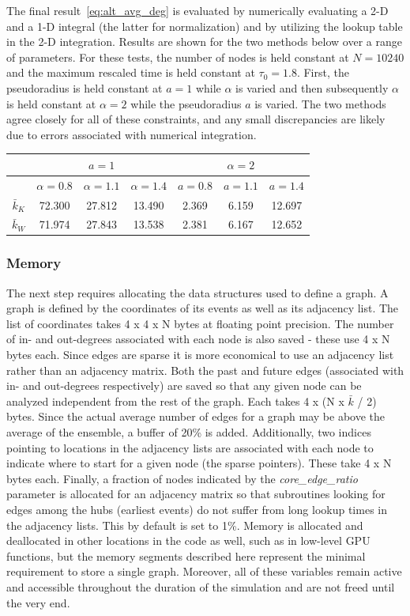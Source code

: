 \documentclass[preprint,notitlepage,amsmath,amssymb,floatfix]{revtex4-1}
\begin{document}
\noindent The final result~\eqref{eq:alt_avg_deg} is evaluated by numerically evaluating a 2-D and a 1-D integral (the latter for normalization) and by utilizing the lookup table in the 2-D integration.
Results are shown for the two methods below over a range of parameters.
For these tests, the number of nodes is held constant at $N = 10240$ and the maximum rescaled time is held constant at $\tau_0 = 1.8$.
First, the pseudoradius is held constant at $a = 1$ while $\alpha$ is varied and then subsequently $\alpha$ is held constant at $\alpha = 2$ while the pseudoradius $a$ is varied.
The two methods agree closely for all of these constraints, and any small discrepancies are likely due to errors associated with numerical integration.

\begin{center}
\begin{tabular}{|c||c|c|c||c|c|c|}
  \hline
  & \multicolumn{3}{|c||}{$a = 1$} & \multicolumn{3}{|c|}{$\alpha = 2$} \\ \hline
  & $\alpha = 0.8$ & $\alpha = 1.1$ & $\alpha = 1.4$ & $a = 0.8$ & $a = 1.1$ & $a = 1.4$ \\ \hline
  $\bar{k}_K$ & 72.300 & 27.812 & 13.490 & 2.369 & 6.159 & 12.697 \\ \hline
  $\bar{k}_W$ & 71.974 & 27.843 & 13.538 & 2.381 & 6.167 & 12.652 \\
  \hline
\end{tabular}
\end{center}

\subsubsection{Memory}
The next step requires allocating the data structures used to define a graph.  
A graph is defined by the coordinates of its events as well as its adjacency list.  
The list of coordinates takes 4 x 4 x N bytes at floating point precision.
The number of in- and out-degrees associated with each node is also saved - these use 4 x N bytes each.
Since edges are sparse it is more economical to use an adjacency list rather than an adjacency matrix.
Both the past and future edges (associated with in- and out-degrees respectively) are saved so that any given node can be analyzed independent from the rest of the graph.  
Each takes 4 x (N x $\bar k$ / 2) bytes.  
Since the actual average number of edges for a graph may be above the average of the ensemble, a buffer of 20\% is added.
Additionally, two indices pointing to locations in the adjacency lists are associated with each node to indicate where to start for a given node (the sparse pointers).
These take 4 x N bytes each.
Finally, a fraction of nodes indicated by the \textit{core\_edge\_ratio} parameter is allocated for an adjacency matrix so that subroutines looking for edges among the hubs (earliest events) do not suffer from long lookup times in the adjacency lists.  
This by default is set to 1\%.
Memory is allocated and deallocated in other locations in the code as well, such as in low-level GPU functions, but the memory segments described here represent the minimal requirement to store a single graph.
Moreover, all of these variables remain active and accessible throughout the duration of the simulation and are not freed until the very end.
\end{document}
